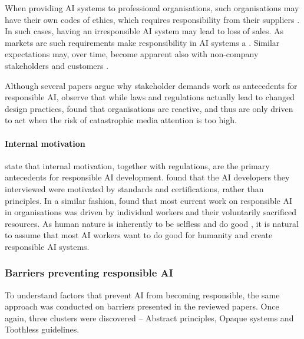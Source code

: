When providing AI systems to professional organisations, such organisations may have their own codes of ethics, which requires responsibility from their suppliers \parencite{Anagnostou_2022}. In such cases, having an irresponsible AI system may lead to loss of sales. As markets are  such requirements make responsibility in AI systems a  \parencite[p.~2]{Gupta_2021}. Similar expectations may, over time, become apparent also with non-company stakeholders and customers \parencite{WangY_2020}.

Although several papers argue why stakeholder demands work as antecedents for responsible AI, \textcite[p.~8]{Morley_2021} observe that while laws and regulations actually lead to changed design practices,  \textcite{Rakova_2021} found that organisations are reactive, and thus are only driven to act when the risk of catastrophic media attention is too high.


\paragraph{Internal motivation}
\textcite{Kumar_2021} state that internal motivation, together with regulations, are the primary antecedents for responsible AI development. \textcite{Henriksen_2021} found that the AI developers they interviewed were motivated by standards and certifications, rather than principles. In a similar fashion, \textcite{Rakova_2021} found that most current work on responsible AI in organisations was driven by individual workers and their voluntarily sacrificed resources. As human nature is inherently to be selfless and do good \parencite{Ward_2012_results}, it is natural to assume that most AI workers want to do good for humanity and create responsible AI systems.


\subsubsection{Barriers preventing responsible AI}
\label{sec:results-barriers}
To understand factors that prevent AI from becoming responsible, the same approach was conducted on barriers presented in the reviewed papers. Once again, three clusters were discovered -- Abstract principles, Opaque systems and Toothless guidelines.

